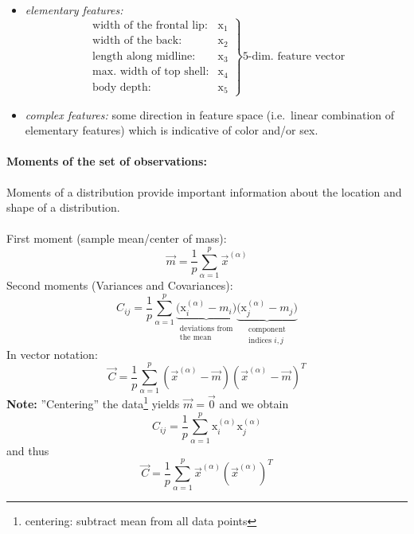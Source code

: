 \begin{itemize}
\item \emph{elementary features: }
\[ \left. \begin{array}{ll}
	\text{width of the frontal lip:} & \mathrm{x}_1 \\
	\text{width of the back:} & \mathrm{x}_2 \\
	\text{length along midline:} & \mathrm{x}_3 \\
	\text{max. width of top shell:} & \mathrm{x}_4 \\
	\text{body depth:} & \mathrm{x}_5
\end{array} \right\} \text{5-dim. feature vector} \]
\item \emph{complex features:} some direction in feature space (i.e.\ linear combination of elementary features) which is indicative of color and/or sex.
\end{itemize}

\paragraph{Moments of the set of observations:} Moments of a distribution provide important information about the location and shape of a distribution.
\\\\
First moment (sample mean/center of mass):
\begin{equation}
	\vec{m} = \frac{1}{p} \sum\limits_{\alpha = 1}^p \vec{x}^{(\alpha)}
\end{equation}
Second moments (Variances and Covariances):
\begin{equation}
	C_{ij} = \frac{1}{p} \sum\limits_{\alpha = 1}^p 
		\underbrace{ \Big( \mathrm{x}_i^{(\alpha)} - m_i \Big) }_{
			\substack{	\text{deviations from} \\
					\text{the mean}} }
		\underbrace{ \Big( \mathrm{x}_j^{(\alpha)} - m_j \Big) }_{
			\substack{	\text{component} \\
					\text{indices } i,j}}
\end{equation}
In vector notation:
\begin{equation} \tag{covariance matrix}
	\vec{C} = \frac{1}{p} \sum\limits_{\alpha=1}^p 
		  \left ( \vec{x}^{(\alpha)} - \vec{m} \right ) \left ( \vec{x}^{(\alpha)} - \vec{m} \right )^T
\end{equation}
\textbf{Note:} ''Centering'' the data\footnote{centering: subtract mean from all data points} yields
$\vec{m} = \vec{0}$ and we obtain
\begin{equation}
	C_{ij} = \frac{1}{p} \sum\limits_{\alpha = 1}^p \mathrm{x}_i^{(\alpha)}
			\mathrm{x}_j^{(\alpha)}
\end{equation}
and thus 
\begin{equation}
	\vec{C} = \frac{1}{p} \sum\limits_{\alpha=1}^p 
		   \vec{x}^{(\alpha)}\left ( \vec{x}^{(\alpha)}\right )^T
\end{equation}

